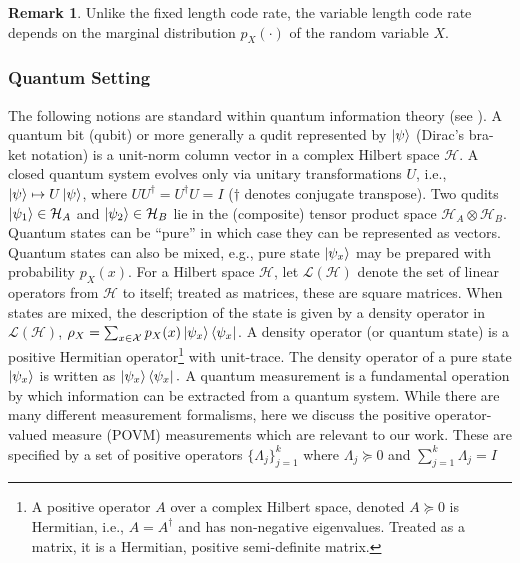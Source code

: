 \documentclass[journal, onecolumn, draftcls]{IEEEtran}
\theoremstyle{definition}
\newtheorem{remark}{Remark}
\newcommand{\calH}{\mathcal{H}}
\newcommand{\calL}{\mathcal{L}}
\newcommand{\calX}{\mathcal{X}}
\newcommand{\bfy}{\mathbf{y}}
\newcommand{\meng}[1]{\marginpar{+}{\bf Ruoyu's remark}: {\em #1}}
\newcommand{\aditya}[1]{\marginpar{+}{\bf Aditya's remark}: {\em #1}}
\begin{document}


\begin{remark}\label{remark:VLC_depends_on_p_X}
    Unlike the fixed length code rate, the variable length code rate depends on the marginal distribution $p_X(\cdot)$ of the random variable $X$.  %
\end{remark}
\subsubsection{\bf Quantum Setting} 
The following notions are standard within quantum information theory (see \cite{wilde_17}). A quantum bit (qubit) or more generally a qudit represented by $\ket{\psi}$ (Dirac's bra-ket notation) is a unit-norm column vector in a complex Hilbert space $\calH$. A closed quantum system evolves only via unitary transformations $U$, i.e., $\ket{\psi} \mapsto U \ket{\psi}$, where $U U^\dagger = U^\dagger U = I$ ($\dagger$ denotes conjugate transpose). Two qudits $\ket{\psi_1} \in \calH_A$ and $\ket{\psi_2} \in \calH_B$ lie in the (composite) tensor product space $\calH_A \otimes \calH_B$. Quantum states can be ``pure'' in which case they can be represented as vectors. Quantum states can also be mixed, e.g., pure state $\ket{\psi_x}$ may be prepared with probability $p_X(x)$. For a Hilbert space $\calH$, let $\calL(\calH)$ denote the set of linear operators from $\calH$ to itself; treated as matrices, these are square matrices. When states are mixed, the description of the state is given by a density operator in $\calL(\calH)$,  $\rho_X = \sum_{x \in \calX} p_X(x) \ket{\psi_x} \bra{\psi_x}$. A density operator (or quantum state) is a positive Hermitian operator\footnote{A positive operator $A$ over a complex Hilbert space, denoted $A \succeq 0$ is Hermitian, i.e., $A = A^\dagger$ and has non-negative eigenvalues. Treated as a matrix, it is a Hermitian, positive semi-definite matrix.} with unit-trace. The density operator of a pure state $\ket{\psi_x}$ is written as $\ket{\psi_x}\bra{\psi_x}.$ A quantum measurement is a fundamental operation by which information can be extracted from a quantum system. While there are many different measurement formalisms, here we discuss the positive operator-valued measure (POVM) measurements which are relevant to our work. These are specified by a set of positive operators $\{\Lambda_j\}_{j=1}^{k}$ where $\Lambda_j \succeq 0$ and $\sum_{j=1}^k \Lambda_j = I$ 
\end{document}
